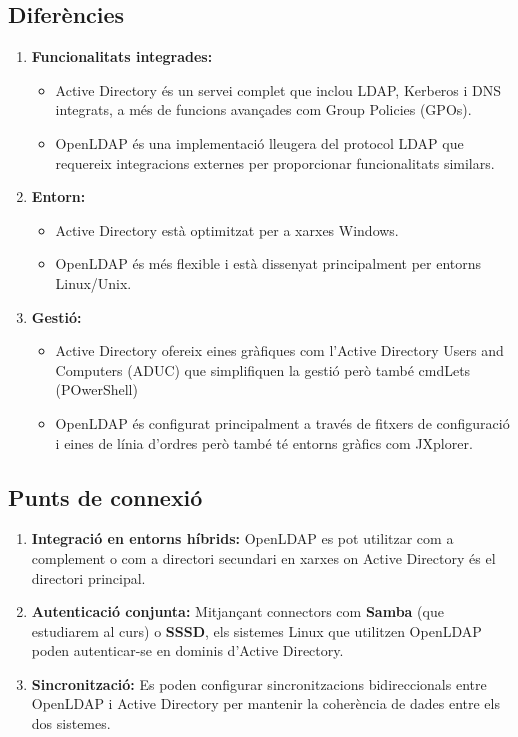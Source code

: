 \documentclass[
  12 pt,
  a4paper,
]{article}
\providecommand{\tightlist}{%
  \setlength{\itemsep}{0pt}\setlength{\parskip}{0pt}}
\begin{document}
\subsection{Diferències}\label{diferuxe8ncies}

\begin{enumerate}
\def\labelenumi{\arabic{enumi}.}
\tightlist
\item
  \textbf{Funcionalitats integrades:}

  \begin{itemize}
  \tightlist
  \item
    Active Directory és un servei complet que inclou LDAP, Kerberos i
    DNS integrats, a més de funcions avançades com Group Policies
    (GPOs).
  \item
    OpenLDAP és una implementació lleugera del protocol LDAP que
    requereix integracions externes per proporcionar funcionalitats
    similars.
  \end{itemize}
\item
  \textbf{Entorn:}

  \begin{itemize}
  \tightlist
  \item
    Active Directory està optimitzat per a xarxes Windows.
  \item
    OpenLDAP és més flexible i està dissenyat principalment per entorns
    Linux/Unix.
  \end{itemize}
\item
  \textbf{Gestió:}

  \begin{itemize}
  \tightlist
  \item
    Active Directory ofereix eines gràfiques com l'Active Directory
    Users and Computers (ADUC) que simplifiquen la gestió però també
    cmdLets (POwerShell)
  \item
    OpenLDAP és configurat principalment a través de fitxers de
    configuració i eines de línia d'ordres però també té entorns gràfics
    com JXplorer.
  \end{itemize}
\end{enumerate}

\subsection{Punts de connexió}\label{punts-de-connexiuxf3}

\begin{enumerate}
\def\labelenumi{\arabic{enumi}.}
\tightlist
\item
  \textbf{Integració en entorns híbrids:} OpenLDAP es pot utilitzar com
  a complement o com a directori secundari en xarxes on Active Directory
  és el directori principal.
\item
  \textbf{Autenticació conjunta:} Mitjançant connectors com
  \textbf{Samba} (que estudiarem al curs) o \textbf{SSSD}, els sistemes
  Linux que utilitzen OpenLDAP poden autenticar-se en dominis d'Active
  Directory.
\item
  \textbf{Sincronització:} Es poden configurar sincronitzacions
  bidireccionals entre OpenLDAP i Active Directory per mantenir la
  coherència de dades entre els dos sistemes.
\end{enumerate}
\end{document}
